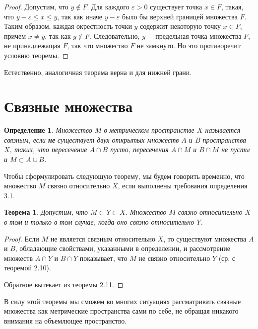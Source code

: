 \documentclass{article}
\newtheorem{theorem}{Теорема}[section]
\newtheorem{definition}{Определение}[section]
\begin{document}
\begin{proof}
Допустим, что \(y \notin F\). Для каждого \(\varepsilon > 0\) существует точка \(x \in F\), такая, что \(y - \varepsilon \leq x \leq y\), так как иначе \(y - \varepsilon\) было бы верхней границей множества \(F\). Таким образом, каждая окрестность точки \(y\) содержит некоторую точку \(x \in F\), причем \(x \neq y\), так как \(y \notin F\). Следовательно, \(y\) \(-\) предельная точка множества \(F\), не принадлежащая \(F\), так что множество \(F\) не замкнуто. Но это противоречит условию теоремы.
\end{proof}

Естественно, аналогичная теорема верна и для нижней грани.

\section{Связные множества}

\begin{definition}
Множество \(M\) в метрическом пространстве \(X\) называется связным, если \textbf{не} существует двух открытых множеств \(A\) и \(B\) пространства \(X\), таких, что пересечение \( A \cap B\) пусто, пересечения \(A \cap M\) и \(B \cap M\) не пусты и \(M \subset A \cup B\).
\end{definition}

Чтобы сформулировать следующую теорему, мы будем говорить временно, что множество \(M\) связно относительно \(X\), если выполнены требования определения 3.1.

\begin{theorem}
Допустим, что \(M \subset Y \subset X\). Множество \(M\) связно относительно \(X\) в том и только в том случае, когда оно связно относительно \(Y\).
\end{theorem}

\begin{proof}
Если \(M\) не является связным относительно \(X\), то существуют множества \(A\) и \(B\), обладающие свойствами, указанными в определении, и рассмотрение множеств \(A \cap Y\) и \(B \cap Y\) показывает, что \(M\) не связно относительно \(Y\) (ср. с теоремой 2.10).

Обратное вытекает из теоремы 2.11.
\end{proof}

В силу этой теоремы мы сможем во многих ситуациях рассматривать связные множества как метрические пространства сами по себе, не обращая никакого внимания на объемлющее пространство.
\end{document}

